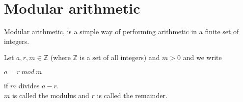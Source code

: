 \section{Modular arithmetic}
Modular arithmetic, is a simple way of performing arithmetic in a finite set of integers.

\begin{defi}
Let \begin{math} a, r,m \in  \mathbb{Z}\end{math} (where \begin{math} \mathbb{Z}\end{math} is a set of all integers) and \begin{math} m > 0\end{math} and we write  
\begin{center} \begin{math} a = r \ mod \ m\end{math} \end{center}
if \begin{math}m \end{math} divides \begin{math} a - r \end{math}.\\
\begin{math}m \end{math} is called the modulus and \begin{math}r \end{math} is called the remainder.
\end{defi}

